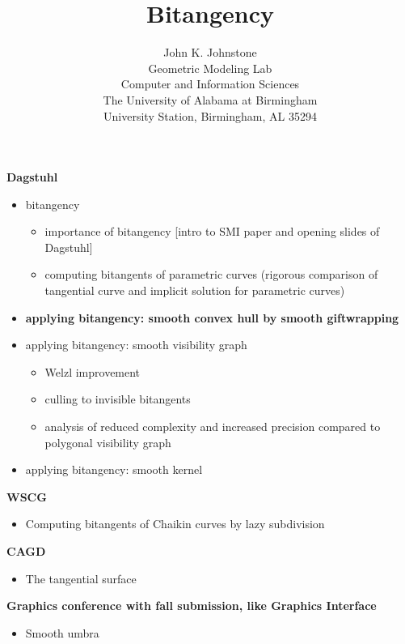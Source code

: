 \documentclass[12pt]{article}
\title{Bitangency}
\author{John K. Johnstone\\
	Geometric Modeling Lab\\
	Computer and Information Sciences\\
	The University of Alabama at Birmingham\\
	University Station, Birmingham, AL 35294}
\begin{document}
\maketitle

{\bf Dagstuhl}
\begin{itemize}
\item	bitangency 
\begin{itemize}
\item	importance of bitangency [intro to SMI paper and opening slides of Dagstuhl]
\item   computing bitangents of parametric curves (rigorous comparison of tangential curve and implicit solution for parametric curves)
\end{itemize}
\item   {\bf applying bitangency: smooth convex hull by smooth giftwrapping}
\item   applying bitangency: smooth visibility graph
\begin{itemize}
\item 	Welzl improvement
\item   culling to invisible bitangents
\item   analysis of reduced complexity and increased precision 
	compared to polygonal visibility graph
\end{itemize}
\item 	applying bitangency: smooth kernel
\end{itemize}

{\bf WSCG}
\begin{itemize}
\item Computing bitangents of Chaikin curves by lazy subdivision
\end{itemize}

{\bf CAGD}
\begin{itemize}
\item The tangential surface
\end{itemize}

{\bf Graphics conference with fall submission, like Graphics Interface}
\begin{itemize}
\item Smooth umbra
\end{itemize}


\clearpage


\tableofcontents

\clearpage
\end{document}
